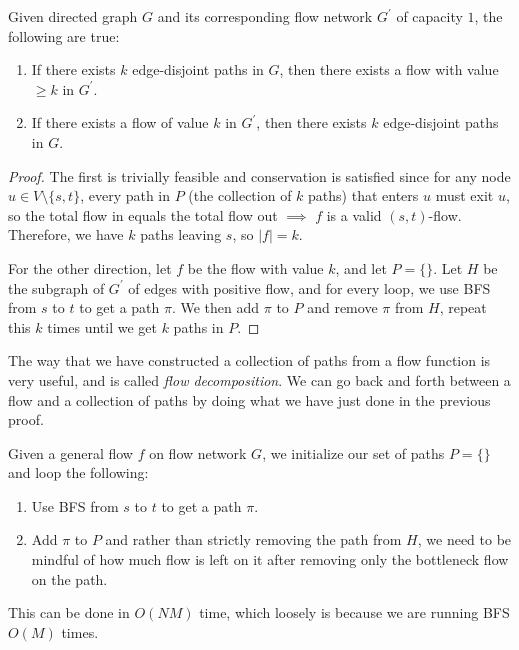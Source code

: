   \begin{theorem}
    Given directed graph $G$ and its corresponding flow network $G^\prime$ of capacity $1$, the following are true: 
    \begin{enumerate}
      \item If there exists $k$ edge-disjoint paths in $G$, then there exists a flow with value $\geq k$ in $G^\prime$. 
      \item If there exists a flow of value $k$ in $G^\prime$, then there exists $k$ edge-disjoint paths in $G$. 
    \end{enumerate}
  \end{theorem}
  \begin{proof}
    The first is trivially feasible and conservation is satisfied since for any node $u \in V \setminus \{s, t\}$, every path in $P$ (the collection of $k$ paths) that enters $u$ must exit $u$, so the total flow in equals the total flow out $\implies$ $f$ is a valid $(s, t)$-flow. Therefore, we have $k$ paths leaving $s$, so $|f| = k$. 

    For the other direction, let $f$ be the flow with value $k$, and let $P = \{\}$. Let $H$ be the subgraph of $G^\prime$ of edges with positive flow, and for every loop, we use BFS from $s$ to $t$ to get a path $\pi$. We then add $\pi$ to $P$ and remove $\pi$ from $H$, repeat this $k$ times until we get $k$ paths in $P$.  
  \end{proof} 

  The way that we have constructed a collection of paths from a flow function is very useful, and is called \textit{flow decomposition}. We can go back and forth between a flow and a collection of paths by doing what we have just done in the previous proof. 

  \begin{definition}
    Given a general flow $f$ on flow network $G$, we initialize our set of paths $P = \{\}$ and loop the following: 
    \begin{enumerate}
      \item Use BFS from $s$ to $t$ to get a path $\pi$. 
      \item Add $\pi$ to $P$ and rather than strictly removing the path from $H$, we need to be mindful of how much flow is left on it after removing only the bottleneck flow on the path. 
    \end{enumerate}
    This can be done in $O(NM)$ time, which loosely is because we are running BFS $O(M)$ times. 
  \end{definition}

